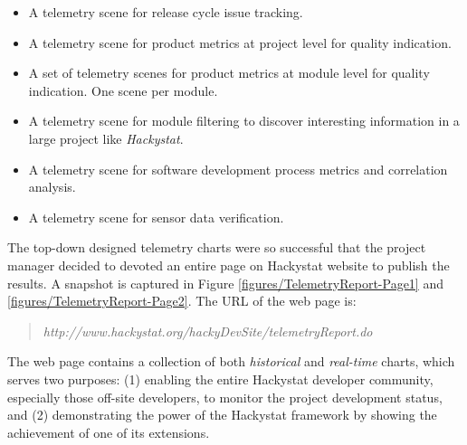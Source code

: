 \begin{itemize}
  \setlength{\itemsep}{0pt}
  \setlength{\parskip}{0pt}
	\item A telemetry scene for release cycle issue tracking.
  \item A telemetry scene for product metrics at project level for quality indication.
  \item A set of telemetry scenes for product metrics at module level for quality indication. One scene per module.
  \item A telemetry scene for module filtering to discover interesting information in a large project like \textit{Hackystat}.
  \item A telemetry scene for software development process metrics and correlation analysis.
  \item A telemetry scene for sensor data verification.
\end{itemize}

The top-down designed telemetry charts were so successful that the project manager decided to devoted an entire page on Hackystat website to publish the results. A snapshot is captured in Figure \ref{figures/TelemetryReport-Page1} and \ref{figures/TelemetryReport-Page2}. The URL of the web page is:
\begin{quotation}
	\textit{http://www.hackystat.org/hackyDevSite/telemetryReport.do}
\end{quotation}

The web page contains a collection of both \textit{historical} and \textit{real-time} charts, which serves two purposes: 
(1) enabling the entire Hackystat developer community, especially those off-site developers, to monitor the project development status, and (2) demonstrating the power of the Hackystat framework by showing the achievement of one of its extensions.

